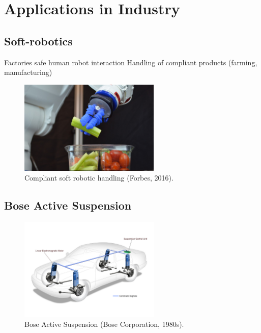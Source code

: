 \section{Applications in Industry}
\subsection{Soft-robotics}
Factories safe human robot interaction
Handling of compliant products (farming, manufacturing)


\begin{figure}
\centering
\includegraphics[width=0.6\textwidth]{images/literature/SoftRobotCelery} 
\caption{Compliant soft robotic handling (Forbes, 2016).}
\label{fig:Compliant soft robotic handling}
\end{figure}
\cite{Knapp}

\subsection{Bose Active Suspension}

\begin{figure}
\centering
\includegraphics[width=0.6\textwidth]{images/literature/Bose-suspension-system.jpg} 
\caption{Bose Active Suspension (Bose Corporation, 1980s)\cite{Bose}.}
\label{fig:Bose Active Suspension}
\end{figure}


